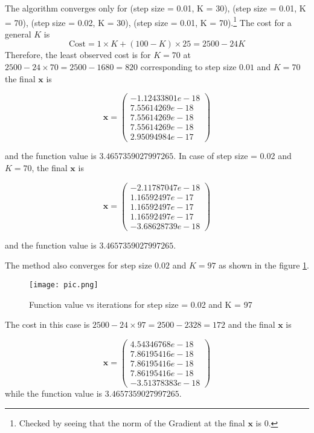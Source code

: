 \documentclass[12pt,a4paper]{article}
\theoremstyle{remark}
\begin{document}
\begin{enumerate}
    The algorithm converges only for (step size = 0.01, K = 30), (step size = 0.01, K = 70), (step size = 0.02, K = 30), (step size = 0.01, K = 70).\footnote{Checked by seeing that the norm of the Gradient at the final $\mathbf{x}$ is $0$.} The cost for a general $K$ is $$\text{Cost} = 1 \times K + (100 - K) \times 25 = 2500 - 24K$$ Therefore, the least observed cost is for $K = 70$ at $2500 - 24 \times 70 = 2500 - 1680 = 820$ corresponding to step size $0.01$ and $K = 70$ the final $\mathbf{x}$ is

    $$\mathbf{x} = \begin{pmatrix}
        -1.12433801e-18 \\
        7.55614269e-18 \\
        7.55614269e-18 \\
        7.55614269e-18 \\
        2.95094984e-17
    \end{pmatrix}$$ 
    
    and the function value is $3.4657359027997265$. In case of step size = 0.02 and $K = 70$, the final $\mathbf{x}$ is

    $$\mathbf{x} = \begin{pmatrix}
        -2.11787047e-18 \\
        1.16592497e-17\\
        1.16592497e-17\\
        1.16592497e-17\\
        -3.68628739e-18
    \end{pmatrix}$$

    and the function value is $3.4657359027997265$.
\end{enumerate}

The method also converges for step size $0.02$ and $K = 97$ as shown in the figure \ref{pic}.

\begin{figure}
    \centering
    \texttt{[image: pic.png]}
    \caption{Function value vs iterations for step size = 0.02 and K = 97}
    \label{pic}
\end{figure}

The cost in this case is $2500 - 24 \times 97 = 2500 - 2328 = 172$ and the final $\mathbf{x}$ is

$$\mathbf{x} = \begin{pmatrix}
    4.54346768e-18 \\
    7.86195416e-18 \\
    7.86195416e-18\\
    7.86195416e-18 \\
    -3.51378383e-18
\end{pmatrix}$$ while the function value is $3.4657359027997265$.
\end{document}
